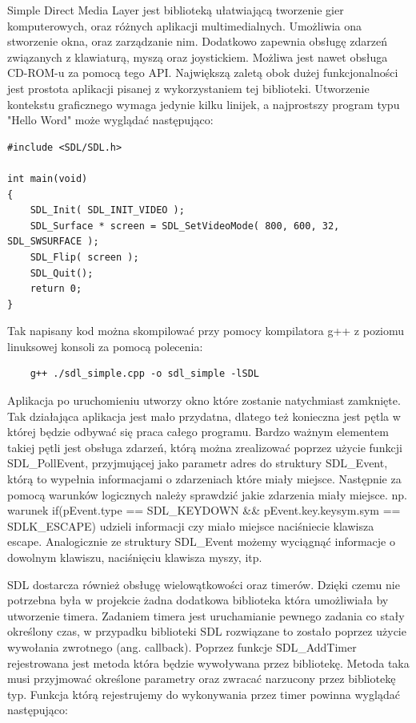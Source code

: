 Simple Direct Media Layer jest biblioteką ułatwiającą tworzenie gier komputerowych, oraz różnych aplikacji multimedialnych. Umożliwia ona stworzenie okna, oraz zarządzanie nim. Dodatkowo zapewnia obsługę zdarzeń związanych z klawiaturą, myszą oraz joystickiem. Możliwa jest nawet obsługa CD-ROM-u za pomocą tego API. Największą zaletą obok dużej funkcjonalności jest prostota aplikacji pisanej z wykorzystaniem tej biblioteki. Utworzenie kontekstu graficznego wymaga jedynie kilku linijek, a najprostszy program typu "Hello Word" może wyglądać następująco:

\begingroup
\fontsize{10pt}{12pt}\selectfont
\begin{verbatim} 
#include <SDL/SDL.h>

int main(void)
{
    SDL_Init( SDL_INIT_VIDEO );
    SDL_Surface * screen = SDL_SetVideoMode( 800, 600, 32, SDL_SWSURFACE );
    SDL_Flip( screen );
    SDL_Quit();
    return 0;
}
\end{verbatim}
\endgroup
Tak napisany kod można skompilować przy pomocy kompilatora g++ z poziomu linuksowej konsoli za pomocą polecenia:
\begin{verbatim} 
	g++ ./sdl_simple.cpp -o sdl_simple -lSDL
\end{verbatim}

Aplikacja po uruchomieniu utworzy okno które zostanie natychmiast zamknięte. Tak działająca aplikacja jest mało przydatna, dlatego też konieczna jest pętla w której będzie odbywać się praca całego programu. Bardzo ważnym elementem takiej pętli jest obsługa zdarzeń, którą można zrealizować poprzez użycie funkcji SDL\_PollEvent, przyjmującej jako parametr adres do struktury SDL\_Event, którą to wypełnia informacjami o zdarzeniach które miały miejsce. Następnie za pomocą warunków logicznych należy sprawdzić jakie zdarzenia miały miejsce. np. warunek if(pEvent.type == SDL\_KEYDOWN \&\& pEvent.key.keysym.sym == SDLK\_ESCAPE)  
udzieli informacji czy miało miejsce naciśniecie klawisza escape. Analogicznie ze struktury SDL\_Event możemy wyciągnąć informacje o dowolnym klawiszu, naciśnięciu klawisza myszy, itp. 

SDL dostarcza również obsługę wielowątkowości oraz timerów. Dzięki czemu nie potrzebna była w projekcie żadna dodatkowa biblioteka która umożliwiała by utworzenie timera. Zadaniem timera jest uruchamianie pewnego zadania co stały określony czas, w przypadku biblioteki SDL rozwiązane to zostało poprzez użycie wywołania zwrotnego (ang. callback). Poprzez funkcje SDL\_AddTimer rejestrowana jest metoda która będzie wywoływana przez bibliotekę. Metoda taka musi przyjmować określone parametry oraz zwracać narzucony przez bibliotekę typ.
Funkcja którą rejestrujemy do wykonywania przez timer powinna wyglądać następująco:

